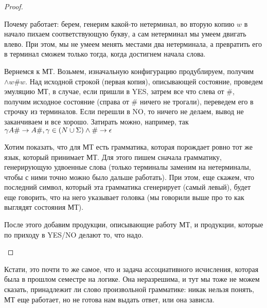 \begin{proof}
\begin{description}
Почему работает: берем, генерим какой-то нетерминал, во вторую копию $w$ в начало пихаем соответствующую букву, а сам нетерминал мы умеем двигать влево. 
При этом, мы не умеем менять местами два нетерминала, а превратить его в терминал сможем только тогда, когда достигнем начала слова.

Вернемся к МТ. Возьмем, изначальную конфигурацию продублируем, получим $\wedge w\#w$.
Над исходной строкой (первая копия), описывающей состояние, проведем эмуляцию МТ, в случае, если пришли в YES, затрем все что слева от \#, получим исходное состояние (справа от \# ничего не трогали),
переведем его в строчку из терминалов.
Если перешли в NO, то ничего не делаем, вывод не заканчиваем и все хорошо.
Затирать можно, например, так
$\\            
\gamma A\# \to A\#, \gamma \in (N \cup \Sigma) \\
\wedge \# \to \epsilon$

Хотим показать, что для МТ есть грамматика, которая порождает ровно тот же язык, который принимает МТ. 
Для этого пишем сначала грамматику, генерирующую удвоенные слова (только терминалы заменим на нетерминалы, чтобы с ними точно можно было дальше работать).
При этом, еще скажем, что последний символ, который эта грамматика сгенерирует (самый левый), будет еще говорить, что на него указывает головка (мы говорили выше про то как выглядят состояния МТ).

После этого добавим продукции, описывающие работу МТ, и продукции, которые по приходу в YES/NO делают то, что надо.
\end{description}
\end{proof}
\begin{Rem}
Кстати, это почти то же самое, что и задача ассоциативного исчисления, которая была в прошлом семестре на логике. 
Она неразрешима, и тут мы тоже не можем сказать, принадлежит ли слово произвольной грамматике: никак нельзя понять, МТ еще работает, но не готова нам выдать ответ, или она зависла. 
\end{Rem}
